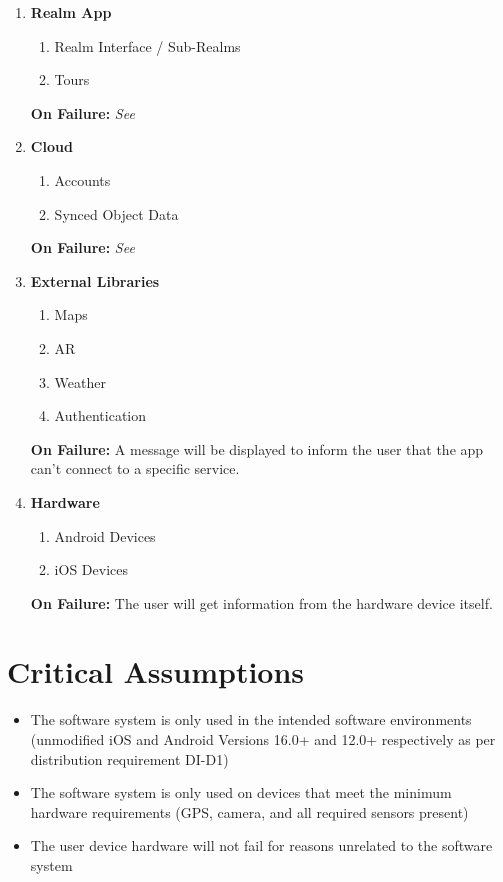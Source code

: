 \documentclass{article}
\begin{document}
\begin{enumerate}[label=\textbf{\arabic*.}]
    \item \textbf{Realm App}
    \begin{enumerate}
        \item Realm Interface / Sub-Realms
        \item Tours
    \end{enumerate}
    \textbf{On Failure:} \emph{See }
    \item \textbf{Cloud}
    \begin{enumerate}
        \item Accounts
        \item Synced Object Data
    \end{enumerate}
    \textbf{On Failure:} \emph{See }
    \item \textbf{External Libraries}
    \begin{enumerate}
        \item Maps
        \item AR
        \item Weather
        \item Authentication
    \end{enumerate}
    \textbf{On Failure:} A message will be displayed to inform the user that the app can't connect to a specific service.
    \item \textbf{Hardware}
    \begin{enumerate}
        \item Android Devices
        \item iOS Devices
    \end{enumerate}
    \textbf{On Failure:} The user will get information from the hardware device itself.
\end{enumerate}

\section{Critical Assumptions}

\begin{itemize}
    \item The software system is only used in the intended software environments (unmodified iOS and Android Versions 16.0+ and 12.0+ respectively as per distribution requirement DI-D1)
    \item The software system is only used on devices that meet the minimum hardware requirements (GPS, camera, and all required sensors present)
    \item The user device hardware will not fail for reasons unrelated to the software system
\end{itemize}
\end{document}
